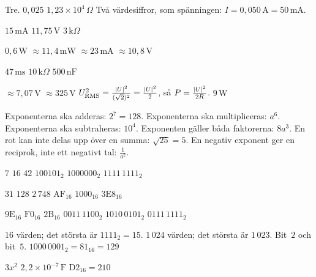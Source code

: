 \begin{facit}
  Tre.  $0{,}025$  $1{,}23 \times 10^4\,\Omega$
 Två värdesiffror, som spänningen: $I = 0{,}050\,\text{A} = 50\,\text{mA}$.

  $15\,\text{mA}$  $11{,}75\,\text{V}$  $3\,\text{k}\Omega$

  $0{,}6\,\text{W}$  $\approx 11{,}4\,\text{mW}$  $\approx
23\,\text{mA}$  $\approx 10{,}8\,\text{V}$

  $47\,\text{ms}$  $10\,\text{k}\Omega$  $500\,\text{nF}$

  $\approx 7{,}07\,\text{V}$  $\approx 325\,\text{V}$
 $U_{\text{RMS}}^2 = \frac{\lvert U\rvert^2}{(\sqrt{2})^2} = \frac{\lvert U\rvert^2}{2}$, så
$P = \frac{\lvert U\rvert^2}{2R}$.
 $9\,\text{W}$

  Exponenterna ska adderas: $2^7 = 128$.
 Exponenterna ska multipliceras: $a^6$.
 Exponenterna ska subtraheras: $10^4$.
 Exponenten gäller båda faktorerna: $8a^3$.
 En rot kan inte delas upp över en summa: $\sqrt{25} = 5$.
 En negativ exponent ger en reciprok, inte ett negativt tal: $\frac{1}{a^2}$.

  $7$  $16$  $42$  $100101_2$  $1000000_2$
 $1111\,1111_2$

  $31$  $128$  $2\,748$  $\mathrm{AF}_{16}$
 $\mathrm{1000}_{16}$  $\mathrm{3E8}_{16}$

  $\mathrm{9E}_{16}$  $\mathrm{F0}_{16}$  $\mathrm{2B}_{16}$
 $0011\,1100_2$  $1010\,0101_2$  $0111\,1111_2$

  $16$ värden; det största är $1111_2 = 15$.  $1\,024$ värden; det största
är $1\,023$.  Bit~$2$ och bit~$5$.  $1000\,0001_2 = \mathrm{81}_{16} = 129$

  $3x^2$  $2{,}2 \times 10^{-7}\,\text{F}$
 $\mathrm{D2}_{16} = 210$

\end{facit}
